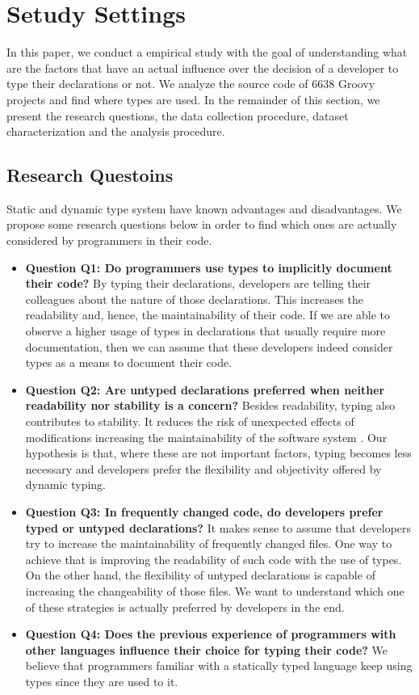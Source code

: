 \documentclass[preprint]{sigplanconf}
\begin{document}
%
%

\section{Setudy Settings\label{settings}}
In this paper, we conduct a empirical study with the goal of understanding what are the factors that have an actual influence over the decision of a developer to type their declarations or not. 
We analyze the source code of 6638 Groovy projects and find where types are used.
In the remainder of this section, we present the research questions, the data collection procedure, dataset characterization and the analysis procedure.

\subsection{Research Questoins\label{questions}}
Static and dynamic type system have known advantages and disadvantages.
We propose some research questions below in order to find which ones are actually considered by programmers in their code.

\begin{itemize}
	\item \textbf{Question Q1: Do programmers use types to implicitly document their code?} By typing their declarations, developers are telling their colleagues about the nature of those declarations. This increases the readability and, hence, the maintainability of their code. If we are able to observe a higher usage of types in declarations that usually require more documentation, then we can assume that these developers indeed consider types as a means to document their code.
	\item \textbf{Question Q2: Are untyped declarations preferred when neither readability nor stability is a concern?} Besides readability, typing also contributes to stability. It reduces the risk of unexpected effects of modifications increasing the maintainability of the software system \cite{Iso2004}. Our hypothesis is that, where these are not important factors, typing becomes less necessary and developers prefer the flexibility and objectivity offered by dynamic typing. 
	\item \textbf{Question Q3: In frequently changed code, do developers prefer typed or untyped declarations?} It makes sense to assume that developers try to increase the maintainability of frequently changed files. One way to achieve that is improving the readability of such code with the use of types. On the other hand, the flexibility of untyped declarations is capable of increasing the changeability of those files. We want to understand which one of these strategies is actually preferred by developers in the end.
	\item \textbf{Question Q4: Does the previous experience of programmers with other languages influence their choice for typing their code?} We believe that programmers familiar with a statically typed language keep using types since they are used to it. 
\end{itemize}
\end{document}
